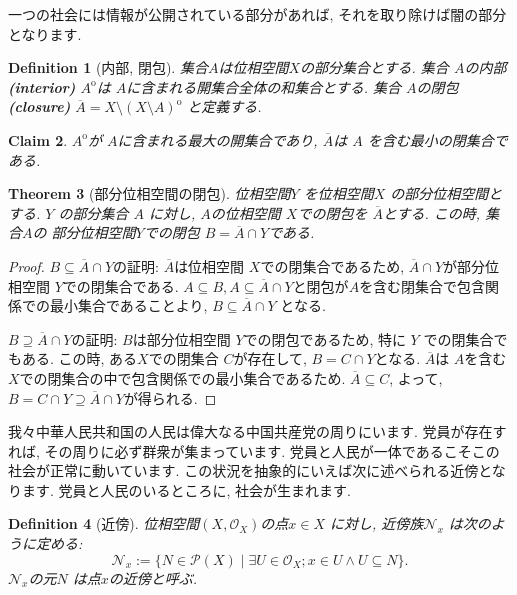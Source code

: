 \documentclass[lualatex]{ltjsbook}
\newcommand{\cl}[1]{\overline{ #1}  }
\newcommand{\Int}[1]{#1 ^{\mathrm{o}} }
\newtheorem{theorem}{Theorem}[chapter]
\newtheorem{definition}[theorem]{Definition}
\newtheorem{claim}[theorem]{Claim}
\theoremstyle{remark}
\theoremstyle{plain}
\begin{document}
一つの社会には情報が公開されている部分があれば,  それを取り除けば闇の部分となります.

\begin{definition}[内部,  閉包]
	集合$A$は位相空間$X$の部分集合とする. 
	集合 $A$の内部\textbf{(interior)} $\Int{A}$は $A$に含まれる開集合全体の和集合とする. 
	集合 $A$の閉包\textbf{(closure)} $\cl{A}= X \setminus\Int{ \left( X\setminus A \right)}$ と定義する.
\end{definition}

\begin{claim}
	$\Int{A}$が $A$に含まれる最大の開集合であり,   $\cl{A}$は $A$ を含む最小の閉集合である.
\end{claim}

\begin{theorem}[部分位相空間の閉包]
	位相空間$Y$ を位相空間$X$ の部分位相空間とする. 
	$Y$ の部分集合 $A$ に対し,  $A$の位相空間 $X$での閉包を $\cl{A}$とする.
	この時,  集合$A$の 部分位相空間$Y$での閉包 $B= \cl{A} \cap Y$である.
\end{theorem}

\begin{proof}
	$B \subseteq \cl{A} \cap Y $の証明:  $\cl{A}$は位相空間 $X$での閉集合であるため,   $\cl{A} \cap Y $が部分位相空間 $Y$での閉集合である.  
	$A \subseteq B,  A \subseteq \cl{A} \cap Y$と閉包が$A$を含む閉集合で包含関係での最小集合であることより,  $B \subseteq \cl{A} \cap Y$ となる.

	$B \supseteq \cl{A} \cap Y$の証明:  $B$は部分位相空間 $Y$での閉包であるため,  特に $Y$ での閉集合でもある. 
	この時,  ある$X$での閉集合 $C$が存在して,   $B=C \cap Y$となる.  
	$\cl{A}$は $A$を含む $X$での閉集合の中で包含関係での最小集合であるため. 
	$\cl{A} \subseteq C$,  よって,   $B = C \cap Y \supseteq \cl{A} \cap Y$が得られる.
\end{proof}

我々中華人民共和国の人民は偉大なる中国共産党の周りにいます. 党員が存在すれば,  その周りに必ず群衆が集まっています. 党員と人民が一体であるこそこの社会が正常に動いています. この状況を抽象的にいえば次に述べられる近傍となります. 党員と人民のいるところに,  社会が生まれます.

\begin{definition}[近傍]
	位相空間$\left( X,  \mathcal{O}_X \right)$の点$x \in X$ に対し,  近傍族$\mathcal{N}_x$ は次のように定める:
	\[
	\mathcal{N}_x := \{N \in \mathcal{P}\left( X \right)  \mid \exists U \in \mathcal{O}_X ; x \in U \land U \subseteq N \} 
	.\] 
	$\mathcal{N}_x $の元$N$ は点$x$の近傍と呼ぶ.
\end{definition}
\end{document}
